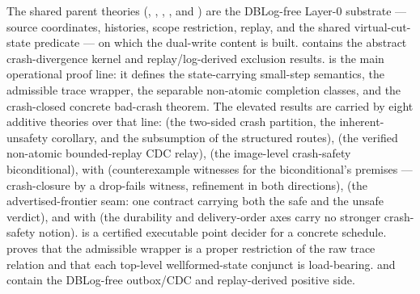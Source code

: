 \documentclass[11pt,a4paper]{article}
\begin{document}
The shared parent theories
(, ,
, , and
) are the DBLog-free
Layer-0 substrate --- source coordinates, histories, scope restriction, replay,
and the shared virtual-cut-state predicate --- on which the dual-write content
is built. 
contains the abstract crash-divergence kernel and replay/log-derived exclusion
results.  is the
main operational proof line: it defines the state-carrying small-step semantics,
the admissible trace wrapper, the separable non-atomic completion classes, and
the crash-closed concrete bad-crash theorem. The elevated results are carried by
eight additive theories over that line:
 (the two-sided
crash partition, the inherent-unsafety corollary, and the subsumption of the
structured routes),
 (the verified
non-atomic bounded-replay CDC relay),
 (the image-level
crash-safety biconditional),
with
(counterexample witnesses for the biconditional's premises --- crash-closure
by a drop-fails witness, refinement in both directions),
(the advertised-frontier seam: one contract carrying both the safe and the
unsafe verdict), and
with
(the durability and delivery-order axes carry no stronger crash-safety notion).
 is a certified
executable point decider for a concrete schedule.
proves that the admissible wrapper is a proper restriction of the raw trace
relation and that each top-level wellformed-state conjunct is load-bearing.
 and
contain the DBLog-free outbox/CDC and replay-derived positive side.
\end{document}

